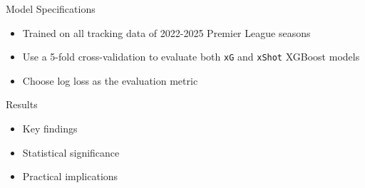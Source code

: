 \documentclass[
  11pt,
  ignorenonframetext,
]{beamer}
\providecommand{\tightlist}{%
  \setlength{\itemsep}{0pt}\setlength{\parskip}{0pt}}
\begin{document}
\begin{frame}[fragile]{Model Specifications}
\protect{}\label{model-specifications}
\begin{itemize}
\tightlist
\item
  Trained on all tracking data of 2022-2025 Premier League seasons
\item
  Use a 5-fold cross-validation to evaluate both \texttt{xG} and
  \texttt{xShot} XGBoost models
\item
  Choose log loss as the evaluation metric
\end{itemize}
\end{frame}

\begin{frame}{Results}
\protect{}\label{results}
\begin{itemize}
\tightlist
\item
  Key findings
\item
  Statistical significance
\item
  Practical implications
\end{itemize}
\end{frame}
\end{document}
